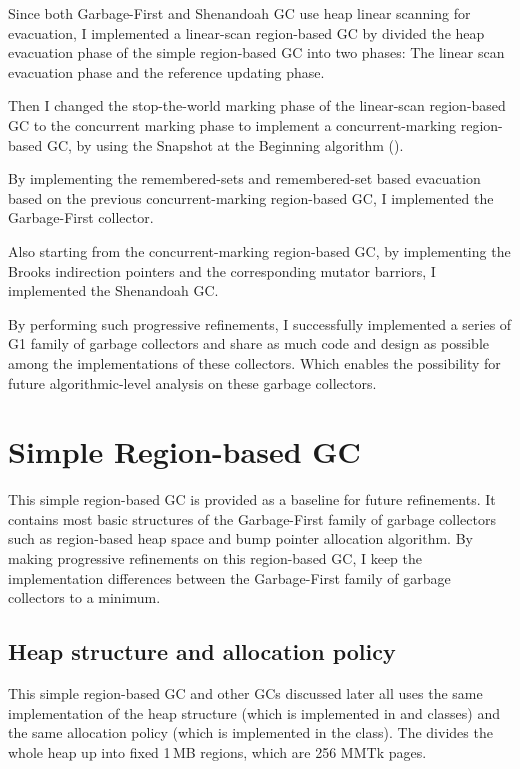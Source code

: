 Since both Garbage-First and Shenandoah GC use heap linear scanning for evacuation,
I implemented a linear-scan region-based GC by divided the heap evacuation phase
of the simple region-based GC into two phases: The linear scan evacuation phase
and the reference updating phase.

Then I changed the stop-the-world marking phase of the linear-scan region-based GC
to the concurrent marking phase to implement a concurrent-marking region-based GC, 
by using the Snapshot at the Beginning algorithm (\cite{yuasa1990real}).

By implementing the remembered-sets and remembered-set based evacuation based on
the previous concurrent-marking region-based GC, I implemented the Garbage-First collector.

Also starting from the concurrent-marking region-based GC, by implementing the Brooks indirection pointers
and the corresponding mutator barriors, I implemented the Shenandoah GC.

By performing such progressive refinements, I successfully implemented a series of
G1 family of garbage collectors and share as much code and design as possible
among the implementations of these collectors. Which enables the possibility for future
algorithmic-level analysis on these garbage collectors.

\section{Simple Region-based GC}
\label{sec:simpleregiongc}

This simple region-based GC is provided as a baseline for future refinements. It contains
most basic structures of the Garbage-First family of garbage collectors such as
region-based heap space and bump pointer allocation algorithm. By making progressive refinements
on this region-based GC, I keep the implementation differences between the
Garbage-First family of garbage collectors to a minimum.

\subsection{Heap structure and allocation policy}

This simple region-based GC and other GCs discussed later all uses the same implementation of the
heap structure (which is implemented in  and  classes) and the
same allocation policy (which is implemented in the  class).
The  divides the whole heap up into fixed 1\,MB regions, which
are 256 MMTk pages.

